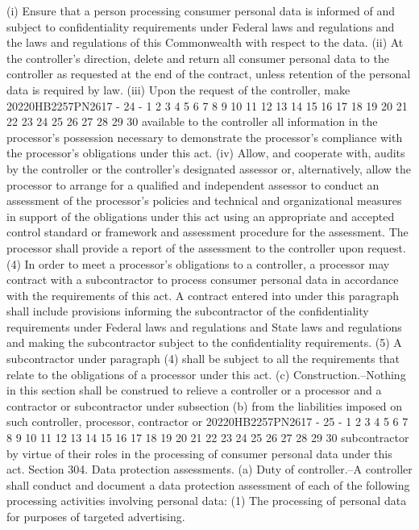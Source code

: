 (i) Ensure that a person processing consumer
personal data is informed of and subject to
confidentiality requirements under Federal laws and
regulations and the laws and regulations of this
Commonwealth with respect to the data.
(ii) At the controller's direction, delete and
return all consumer personal data to the controller as
requested at the end of the contract, unless retention of
the personal data is required by law.
(iii) Upon the request of the controller, make
20220HB2257PN2617 - 24 -
1
2
3
4
5
6
7
8
9
10
11
12
13
14
15
16
17
18
19
20
21
22
23
24
25
26
27
28
29
30
available to the controller all information in the
processor's possession necessary to demonstrate the
processor's compliance with the processor's obligations
under this act.
(iv) Allow, and cooperate with, audits by the
controller or the controller's designated assessor or,
alternatively, allow the processor to arrange for a
qualified and independent assessor to conduct an
assessment of the processor's policies and technical and
organizational measures in support of the obligations
under this act using an appropriate and accepted control
standard or framework and assessment procedure for the
assessment. The processor shall provide a report of the
assessment to the controller upon request.
(4) In order to meet a processor's obligations to a
controller, a processor may contract with a subcontractor to
process consumer personal data in accordance with the
requirements of this act. A contract entered into under this
paragraph shall include provisions informing the
subcontractor of the confidentiality requirements under
Federal laws and regulations and State laws and regulations
and making the subcontractor subject to the confidentiality
requirements.
(5) A subcontractor under paragraph (4) shall be subject
to all the requirements that relate to the obligations of a
processor under this act.
(c) Construction.--Nothing in this section shall be
construed to relieve a controller or a processor and a
contractor or subcontractor under subsection (b) from the
liabilities imposed on such controller, processor, contractor or
20220HB2257PN2617 - 25 -
1
2
3
4
5
6
7
8
9
10
11
12
13
14
15
16
17
18
19
20
21
22
23
24
25
26
27
28
29
30
subcontractor by virtue of their roles in the processing of
consumer personal data under this act.
Section 304. Data protection assessments.
(a) Duty of controller.--A controller shall conduct and
document a data protection assessment of each of the following
processing activities involving personal data:
(1) The processing of personal data for purposes of
targeted advertising.
